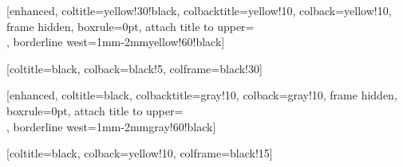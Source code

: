 [enhanced, coltitle=yellow!30!black, 
                                colbacktitle=yellow!10, colback=yellow!10,
                                frame hidden, boxrule=0pt,
                                attach title to upper={\\[0.5ex]}, 
                                borderline west={1mm}{-2mm}{yellow!60!black}]
                                
[coltitle=black, colback=black!5,
                                 colframe=black!30]
                                 
[enhanced, coltitle=black, 
                                colbacktitle=gray!10, colback=gray!10,
                                frame hidden, boxrule=0pt,
                                attach title to upper={\\[0.5ex]}, 
                                borderline west={1mm}{-2mm}{gray!60!black}]

[coltitle=black, colback=yellow!10,
                                     colframe=black!15]



\newcommand{\PA}{\textsf{PA}}
\newcommand{\HA}{\textsf{HA}}
\newcommand{\Gti}{\textsf{G3i}}

\newcommand{\nat}{\mathbb{N}}
\newcommand{\term}{\textsf{term}}
\newcommand{\form}{\textsf{form}}
\DeclareMathOperator{\FV}{FV}
\DeclareMathOperator{\BV}{BV}
\DeclareMathOperator{\id}{id}
\DeclareMathOperator{\shift}{\uparrow}
\DeclareMathOperator{\pred}{pred}
\newcommand{\cons}[2]{\operatorname{cons}(#1,#2)}
\DeclareMathOperator{\scom}{\circ}
\DeclareMathOperator{\swap}{\sigma_{0,1}}
\DeclareMathOperator{\up}{\;\Uparrow}

\newcommand{\seq}[2]{#1 \vdash #2}
\newcommand{\seqd}[4]{#1 \vdash^{#3}_{#4} #2}
\DeclareMathOperator{\gr}{gr}
\DeclareMathOperator{\val}{val}
\newcommand{\nmrl}[1]{\widebar{#1}}

\newcommand{\todo}[1]{\textcolor{orange}{\textbf{[To do: #1]}}}

\def\rm#1{\ensuremath{\mathrm{#1}}}

\theoremstyle{plain}
\newtheorem{theorem}{Theorem}[chapter]
\newtheorem{lemma}[theorem]{Lemma}
\newtheorem{corollary}[theorem]{Corollary}

\theoremstyle{definition}
\newtheorem{definition}[theorem]{Definition}
\newtheorem{example}[theorem]{Example}

\theoremstyle{remark}
\newtheorem{remark}[theorem]{Remark}

 

